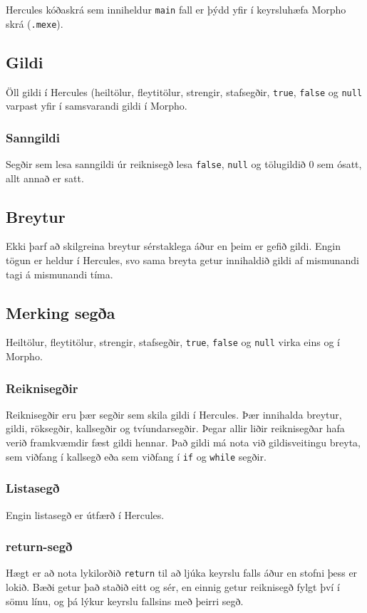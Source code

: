 \documentclass[12pt,a4paper]{article}
\begin{document}
Hercules kóðaskrá sem inniheldur {\tt main} fall er þýdd yfir í keyrsluhæfa Morpho skrá ({\tt .mexe}).

\subsection{Gildi}
Öll gildi í Hercules (heiltölur, fleytitölur, strengir, stafsegðir, {\tt true}, {\tt false} og {\tt null} varpast yfir í samsvarandi gildi í Morpho.

\subsubsection{Sanngildi}
Segðir sem lesa sanngildi úr reiknisegð lesa {\tt false}, {\tt null} og tölugildið 0 sem ósatt, allt annað er satt.

\subsection{Breytur}
Ekki þarf að skilgreina breytur sérstaklega áður en þeim er gefið gildi. Engin tögun er heldur í Hercules, svo sama breyta getur innihaldið gildi af
mismunandi tagi á mismunandi tíma.

\subsection{Merking segða}
Heiltölur, fleytitölur, strengir, stafsegðir, {\tt true}, {\tt false} og {\tt null} virka eins og í Morpho.

\subsubsection{Reiknisegðir}
Reiknisegðir eru þær segðir sem skila gildi í Hercules. Þær innihalda breytur, gildi, röksegðir, kallsegðir og tvíundarsegðir. Þegar allir liðir reiknisegðar
hafa verið framkvæmdir fæst gildi hennar. Það gildi má nota við gildisveitingu breyta, sem viðfang í kallsegð
eða sem viðfang í {\tt if} og {\tt while} segðir.

\subsubsection{Listasegð}
Engin listasegð er útfærð í Hercules.

\subsubsection{return-segð}
Hægt er að nota lykilorðið {\tt return} til að ljúka keyrslu falls áður en stofni þess er lokið. Bæði getur það staðið eitt og sér, en einnig getur
reiknisegð fylgt því í sömu línu, og þá lýkur keyrslu fallsins með þeirri segð.
\end{document}
